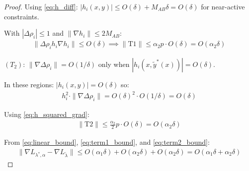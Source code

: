 \documentclass[letterpaper]{article} %
\newcommand{\1}{\mathbf{1}}
\begin{document}
\begin{proof}
Using \eqref{eq:h_diff}: $|h_i(x,y)| \leq O(\delta) + M_{AB}\delta = O(\delta)$ for near-active constraints.

With $|\Delta\rho_i| \leq 1$ and $\|\nabla h_i\| \leq 2M_{AB}$:
\begin{align}
\|\Delta\rho_i h_i \nabla h_i\| \leq O(\delta) \implies \|\text{T1}\| \leq \alpha_2 p \cdot O(\delta) = O(\alpha_2 \delta) \label{eq:term1_bound}
\end{align}

$(T_2)$: $\|\nabla\Delta\rho_i\| = O(1/\delta)$ only when $|h_i(x,\tilde{y}^*(x))| = O(\delta)$.

In these regions: $|h_i(x,y)| = O(\delta)$ so:
\begin{align}
h_i^2 \cdot \|\nabla\Delta\rho_i\| = O(\delta)^2 \cdot O(1/\delta) = O(\delta) \label{eq:h_squared_grad}
\end{align}

Using \eqref{eq:h_squared_grad}:
\begin{align}
\|\text{T2}\| \leq \frac{\alpha_2}{2} p \cdot O(\delta) = O(\alpha_2 \delta) \label{eq:term2_bound}
\end{align}

From \eqref{eq:linear_bound}, \eqref{eq:term1_bound}, and \eqref{eq:term2_bound}:
\begin{align}
\|\nabla L_{\lambda^*, \alpha} - \nabla L_{\tilde{\lambda}}\| \leq O(\alpha_1 \delta) + O(\alpha_2 \delta) + O(\alpha_2 \delta) = O(\alpha_1 \delta + \alpha_2 \delta)
\end{align}
\end{proof}
\end{document}
